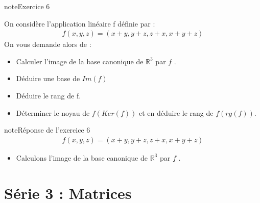 \documentclass[letterpaper,10pt,french]{jupyterBook}
\begin{document}
\begin{sphinxadmonition}{note}{Exercice 6}

\sphinxAtStartPar
On considère l’application linéaire f définie par :
\begin{equation*}
\begin{split}
 f( x,y,z) = (x + y, y + z, z + x, x + y + z)
\end{split}
\end{equation*}
\sphinxAtStartPar
On vous demande alors de :
\begin{itemize}
\item {} 
\sphinxAtStartPar
Calculer l’image de la base canonique de \(\mathbb{R}^3\)  par \(f\) .

\item {} 
\sphinxAtStartPar
Déduire une base de \(Im(f)\)

\item {} 
\sphinxAtStartPar
Déduire le rang de f.

\item {} 
\sphinxAtStartPar
Déterminer le noyau de \(f(Ker(f))\) et en déduire le rang de \(f(rg( f ))\).

\end{itemize}
\end{sphinxadmonition}

\begin{sphinxadmonition}{note}{Réponse de l’exercice 6}
\begin{equation*}
\begin{split}
 f( x,y,z) = (x + y, y + z, z + x, x + y + z)
\end{split}
\end{equation*}\begin{itemize}
\item {} 
\sphinxAtStartPar
Calculons l’image de la base canonique de \(\mathbb{R}^3\)  par \(f\) .

\end{itemize}
\end{sphinxadmonition}

\begin{sphinxVerbatim}[commandchars=\\\{\}]

\end{sphinxVerbatim}


\chapter{Série 3 : Matrices}
\label{\detokenize{S_xe9rie3:serie-3-matrices}}\label{\detokenize{S_xe9rie3::doc}}
\end{document}
